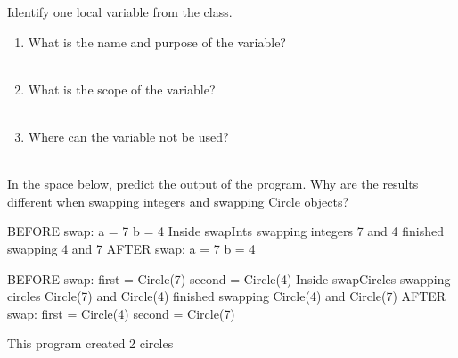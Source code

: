 \Q Identify one local variable from the  class.
\begin{enumerate}
\item What is the name and purpose of the variable?
\\  \\[-2em]

\item What is the scope of the variable?
\\  \\[-2em]

\item Where can the variable not be used?
\\  \\[-2em]
\end{enumerate}

\Q In the space below, predict the output of the  program.
Why are the results different when swapping integers and swapping Circle objects?

\begin{answer}[14em]
\begin{minipage}{190pt}

\begin{javaans}
BEFORE swap:
a = 7
b = 4
    Inside swapInts
    swapping integers 7 and 4
    finished swapping 4 and 7
AFTER swap:
a = 7
b = 4
\end{javaans}

\end{minipage}
\hspace{1em}
\begin{minipage}{290pt}

\begin{javaans}
BEFORE swap:
first = Circle(7)
second = Circle(4)
    Inside swapCircles
    swapping circles Circle(7) and Circle(4)
    finished swapping Circle(4) and Circle(7)
AFTER swap:
first = Circle(4)
second = Circle(7)
\end{javaans}

\end{minipage}
\begin{javaans}
This program created 2 circles
\end{javaans}
\end{answer}

\newpage

